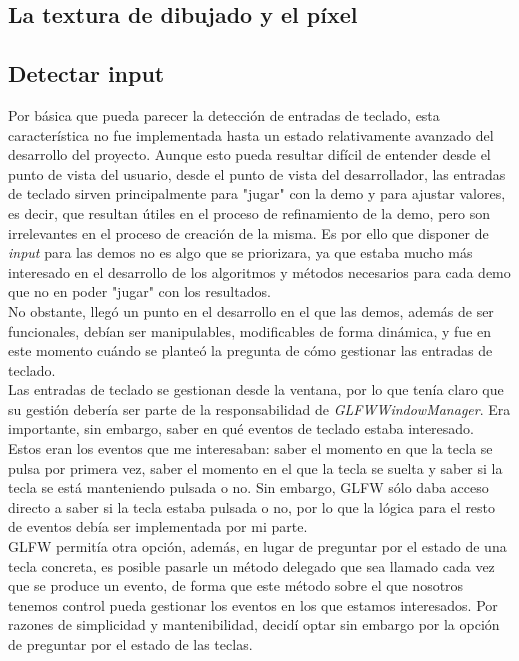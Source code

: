 \subsection{La textura de dibujado y el píxel}

\subsection{Detectar input}

Por básica que pueda parecer la detección de entradas de teclado, esta característica no fue implementada hasta un estado relativamente avanzado del desarrollo del proyecto. Aunque esto pueda resultar difícil de entender desde el punto de vista del usuario, desde el punto de vista del desarrollador, las entradas de teclado sirven principalmente para "jugar" con la demo y para ajustar valores, es decir, que resultan útiles en el proceso de refinamiento de la demo, pero son irrelevantes en el proceso de creación de la misma. Es por ello que disponer de \emph{input} para las demos no es algo que se priorizara, ya que estaba mucho más interesado en el desarrollo de los algoritmos y métodos necesarios para cada demo que no en poder "jugar" con los resultados.\\

No obstante, llegó un punto en el desarrollo en el que las demos, además de ser funcionales, debían ser manipulables, modificables de forma dinámica, y fue en este momento cuándo se planteó la pregunta de cómo gestionar las entradas de teclado.\\

Las entradas de teclado se gestionan desde la ventana, por lo que tenía claro que su gestión debería ser parte de la responsabilidad de \emph{GLFWWindowManager}. Era importante, sin embargo, saber en qué eventos de teclado estaba interesado.\\

Estos eran los eventos que me interesaban: saber el momento en que la tecla se pulsa por primera vez, saber el momento en el que la tecla se suelta y saber si la tecla se está manteniendo pulsada o no. Sin embargo, GLFW sólo daba acceso directo a saber si la tecla estaba pulsada o no, por lo que la lógica para el resto de eventos debía ser implementada por mi parte.\\

GLFW permitía otra opción, además, en lugar de preguntar por el estado de una tecla concreta, es posible pasarle un método delegado que sea llamado cada vez que se produce un evento, de forma que este método sobre el que nosotros tenemos control pueda gestionar los eventos en los que estamos interesados. Por razones de simplicidad y mantenibilidad, decidí optar sin embargo por la opción de preguntar por el estado de las teclas.\\

